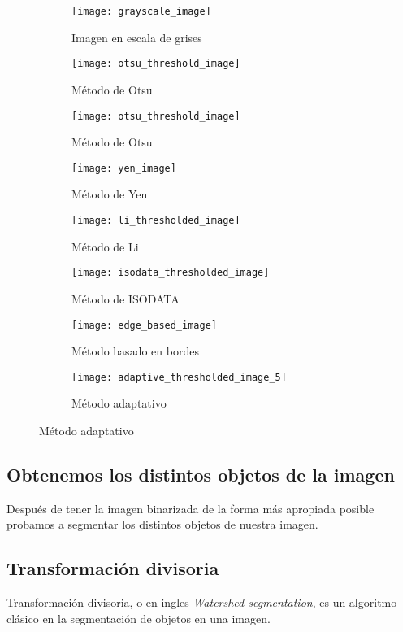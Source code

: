 \begin{figure}
	\centering
	\begin{subfigure}[b]{0.45\textwidth}
        \texttt{[image: grayscale\_image]}
        \caption{Imagen en escala de grises}
    \end{subfigure}
    \begin{subfigure}[b]{0.45\textwidth}
        \texttt{[image: otsu\_threshold\_image]}
        \caption{Método de Otsu}
    \end{subfigure}
    \begin{subfigure}[b]{0.45\textwidth}
        \texttt{[image: otsu\_threshold\_image]}
        \caption{Método de Otsu}
    \end{subfigure}
    \begin{subfigure}[b]{0.45\textwidth}
        \texttt{[image: yen\_image]}
        \caption{Método de Yen}
    \end{subfigure}
    \begin{subfigure}[b]{0.45\textwidth}
        \texttt{[image: li\_thresholded\_image]}
        \caption{Método de Li}
    \end{subfigure}
    \begin{subfigure}[b]{0.45\textwidth}
        \texttt{[image: isodata\_thresholded\_image]}
        \caption{Método de ISODATA}    
    \end{subfigure}
    \begin{subfigure}[b]{0.45\textwidth}
        \texttt{[image: edge\_based\_image]}
        \caption{Método basado en bordes}    
    \end{subfigure}
    \begin{subfigure}[b]{0.45\textwidth}
        \texttt{[image: adaptive\_thresholded\_image\_5]}
        \caption{Método adaptativo}    
    \end{subfigure}
\end{figure} 

\subsection{Obtenemos los distintos objetos de la imagen}
Después de tener la imagen binarizada de la forma más apropiada posible probamos a segmentar los distintos objetos de nuestra imagen.

\subsection{Transformación divisoria}
Transformación divisoria, o en ingles \textit{Watershed segmentation}, es un algoritmo clásico en la segmentación de objetos en una imagen.

